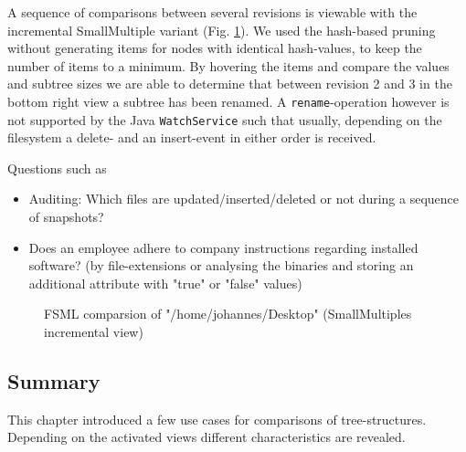 A sequence of comparisons between several revisions is viewable with the incremental SmallMultiple variant (Fig. \ref{fig:fsml-smallmultiples-incremental}). We used the hash-based pruning without generating items for nodes with identical hash-values, to keep the number of items to a minimum. By hovering the items and compare the values and subtree sizes we are able to determine that between revision 2 and 3 in the bottom right view a subtree has been renamed. A \texttt{rename}-operation however is not supported by the Java \texttt{WatchService} such that usually, depending on the filesystem a delete- and an insert-event in either order is received.

Questions such as 

\begin{itemize}
\item Auditing: Which files are updated/inserted/deleted or not during a sequence of snapshots?
\item Does an employee adhere to company instructions regarding installed software? (by file-extensions or analysing the binaries and storing an additional attribute with "true" or "false" values)
\end{itemize}

\begin{figure}[tb]
\caption{\label{fig:fsml-smallmultiples-incremental} FSML comparsion of "/home/johannes/Desktop" (SmallMultiples incremental view)}
\end{figure}

\subsection{Summary}
This chapter introduced a few use cases for comparisons of tree-structures. Depending on the activated views different characteristics are revealed. 

